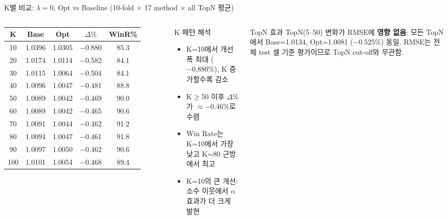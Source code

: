 \documentclass[aspectratio=169,10pt]{beamer}
\begin{document}
\begin{frame}{K별 비교: $\lambda=0$, Opt vs Baseline \textnormal{\small(10-fold $\times$ 17 method $\times$ all TopN 평균)}}
	\begin{columns}[T]
			\renewcommand{\arraystretch}{1.3}
			\begin{tabular}{c|c|c|c|c}
				\toprule
				K & Base & Opt & $\Delta\%$ & WinR\% \\
				\midrule
				10  & 1.0396 & 1.0305 & \textcolor{testgreen}{$-$0.880} & 85.3 \\
				20  & 1.0174 & 1.0114 & \textcolor{testgreen}{$-$0.582} & 84.1 \\
				30  & 1.0115 & 1.0064 & \textcolor{testgreen}{$-$0.504} & 84.1 \\
				40  & 1.0096 & 1.0047 & \textcolor{testgreen}{$-$0.481} & 88.8 \\
				50  & 1.0089 & 1.0042 & \textcolor{testgreen}{$-$0.469} & 90.0 \\
				60  & 1.0089 & 1.0042 & \textcolor{testgreen}{$-$0.465} & 90.6 \\
				70  & 1.0091 & 1.0044 & \textcolor{testgreen}{$-$0.462} & 91.2 \\
				80  & 1.0094 & 1.0047 & \textcolor{testgreen}{$-$0.461} & 91.8 \\
				90  & 1.0097 & 1.0050 & \textcolor{testgreen}{$-$0.462} & 90.6 \\
				100 & 1.0101 & 1.0054 & \textcolor{testgreen}{$-$0.468} & 89.4 \\
				\bottomrule
			\end{tabular}

			\begin{block}{K 패턴 해석}
				\begin{itemize}
					\item K=10에서 개선폭 최대 ($-0.880\%$), K 증가할수록 감소
					\item K$\geq$50 이후 $\Delta\%$가 $\approx -0.46\%$로 수렴
					\item Win Rate는 K=10에서 가장 낮고 K=80 근방에서 최고
					\item K=10의 큰 개선: 소수 이웃에서 $\alpha$ 효과가 더 크게 발현
				\end{itemize}
			\end{block}

			\begin{alertblock}{TopN 효과}
				TopN(5--50) 변화가 RMSE에 \textbf{영향 없음}: 모든 TopN에서 Base=1.0134, Opt=1.0081 ($-0.525\%$) 동일. RMSE는 전체 test 셀 기준 평가이므로 TopN cut-off와 무관함.
			\end{alertblock}
	\end{columns}
\end{frame}
\end{document}
